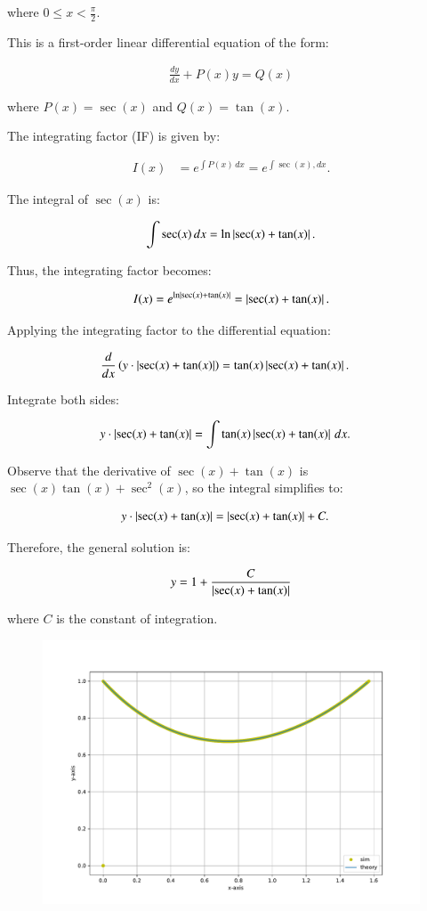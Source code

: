 \documentclass[journal]{IEEEtran}
\begin{document}
where $0 \leq x < \frac{\pi}{2}$.

This is a first-order linear differential equation of the form:

\begin{align}
\frac{dy}{dx} + P(x)y = Q(x)
\end{align}

where $P(x) = \sec(x)$ and $Q(x) = \tan(x)$.

The integrating factor (IF) is given by:

\begin{align}
I(x) &= e^{\int P(x) \, dx} = e^{\int \sec (x), dx}.
\end{align}

The integral of $\sec(x)$ is:

\begin{align}
\int \sec(x) \, dx = \ln \left\vert\sec(x) + \tan(x)\right\vert.
\end{align}

Thus, the integrating factor becomes:

\begin{align}
I(x) = e^{\ln\left\vert\sec(x) + \tan(x)\right\vert} = \left\vert\sec(x) + \tan(x)\right\vert.
\end{align}

Applying the integrating factor to the differential equation:

\begin{align}
\frac{d}{dx}\left( y \cdot \left\vert\sec(x) + \tan(x)\right\vert\right) &= \tan(x) \left\vert\sec(x) + \tan(x)\right\vert.
\end{align}

Integrate both sides:

\begin{align}
y \cdot \left\vert\sec(x) + \tan(x)\right\vert &= \int \tan(x) \left\vert\sec(x) + \tan(x)\right\vert \, dx.
\end{align}

Observe that the derivative of $\sec(x) + \tan(x)$ is $\sec(x)\tan(x) + \sec^2(x)$, so the integral simplifies to:

\begin{align}
y \cdot \left\vert\sec(x) + \tan(x)\right\vert &= \left\vert\sec(x) + \tan(x)\right\vert + C.
\end{align}

Therefore, the general solution is:

\begin{align}
y = 1 + \frac{C}{\left\vert\sec(x) + \tan(x)\right\vert}
\end{align}

where $C$ is the constant of integration.

\begin{figure}[h!]
   \centering
   \includegraphics[width=0.7\columnwidth]{figs/combined_plot.pdf}
\end{figure}
\end{document}
